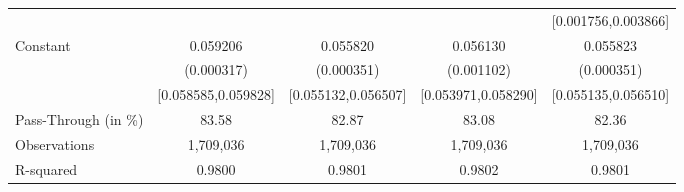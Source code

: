 {\begin{tabular}{l*{4}{c}}
                    &                     &                     &                     &[0.001756,0.003866]         \\
Constant            &    0.059206\sym{***}&    0.055820\sym{***}&    0.056130\sym{***}&    0.055823\sym{***}\\
                    &  (0.000317)         &  (0.000351)         &  (0.001102)         &  (0.000351)         \\
                    &[0.058585,0.059828]         &[0.055132,0.056507]         &[0.053971,0.058290]         &[0.055135,0.056510]         \\
\midrule
Pass-Through (in \%)&       83.58         &       82.87         &       83.08         &       82.36         \\
Observations        &   1,709,036         &   1,709,036         &   1,709,036         &   1,709,036         \\
R-squared           &      0.9800         &      0.9801         &      0.9802         &      0.9801         \\
\bottomrule
\end{tabular}
}
